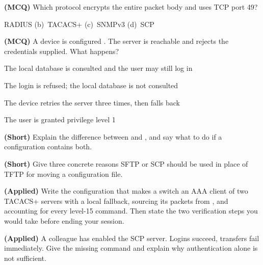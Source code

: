 \begin{reviewq}
  \item \textbf{(MCQ)} Which protocol encrypts the entire packet body and uses
        TCP port 49?
        \begin{tight}
          \item[(a)] RADIUS \quad (b)~TACACS+ \quad (c)~SNMPv3 \quad (d)~SCP
        \end{tight}
  \item \textbf{(MCQ)} A device is configured
        . The server is
        reachable and rejects the credentials supplied. What happens?
        \begin{tight}
          \item[(a)] The local database is consulted and the user may still log in
          \item[(b)] The login is refused; the local database is not consulted
          \item[(c)] The device retries the server three times, then falls back
          \item[(d)] The user is granted privilege level 1
        \end{tight}
  \item \textbf{(Short)} Explain the difference between  and
        , and say what to do if a configuration contains both.
  \item \textbf{(Short)} Give three concrete reasons SFTP or SCP should be used in
        place of TFTP for moving a configuration file.
  \item \textbf{(Applied)} Write the configuration that makes a switch an AAA
        client of two TACACS+ servers with a local fallback, sourcing its packets
        from , and accounting for every level-15 command. Then
        state the two verification steps you would take before ending your
        session.
  \item \textbf{(Applied)} A colleague has enabled the SCP server. Logins
        succeed, transfers fail immediately. Give the missing command and explain
        why authentication alone is not sufficient.
\end{reviewq}
